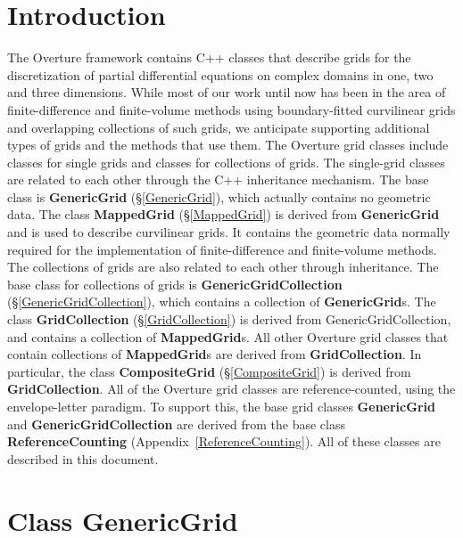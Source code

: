 \documentclass{article}
\begin{document}
\tableofcontents
\vfill\eject

\section{Introduction}
\label{Introduction}

The Overture framework contains C++ classes that describe grids for the
discretization of partial differential equations on complex domains in one,
two and three dimensions.  While most of our work until now has been in the
area of finite-difference and finite-volume methods using boundary-fitted
curvilinear grids and overlapping collections of such grids, we anticipate
supporting additional types of grids and the methods that use them.
The Overture grid classes include classes for single grids and classes
for collections of grids.  The single-grid classes are related to each
other through the C++ inheritance mechanism.  The base class is
\textbf{ GenericGrid} (\S\ref{GenericGrid}),
which actually contains no geometric data.  The class
\textbf{MappedGrid} (\S\ref{MappedGrid})
is derived from \textbf{GenericGrid} and is used to describe
curvilinear grids.  It contains the geometric data normally required for
the implementation of finite-difference and finite-volume methods.
The collections of grids are also related to each other through
inheritance.  The base class for collections of grids is
\textbf{GenericGridCollection} (\S\ref{GenericGridCollection}),
which contains a collection of \textbf{GenericGrid}s.  The class
\textbf{GridCollection} (\S\ref{GridCollection})
is derived from GenericGridCollection, and contains a collection of
\textbf{MappedGrid}s.  All other Overture grid classes that
contain collections of \textbf{MappedGrid}s are derived from
\textbf{GridCollection}.  In particular, the class
\textbf{CompositeGrid} (\S\ref{CompositeGrid})
is derived from \textbf{GridCollection}.  All of the Overture grid
classes are reference-counted, using the envelope-letter paradigm.
To support this, the base grid classes \textbf{GenericGrid} and
\textbf{GenericGridCollection} are derived from the base class
\textbf{ReferenceCounting} (Appendix~\ref{ReferenceCounting}).
All of these classes are described in this document.


\section{Class \textbf{GenericGrid}} 
\label{GenericGrid}
\end{document}
